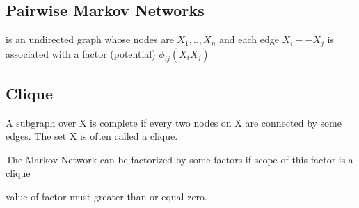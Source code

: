 \documentclass{book}
\begin{document}
\subsection{Pairwise Markov Networks}

is an undirected graph whose nodes are $X_1,..,X_n$ and each edge $X_i -- X_j$ is associated with a factor (potential) $\phi_{ij}(X_i X_j)$

\subsection{Clique}

A subgraph over X is complete if every two nodes on X are connected by some edges. The set X is often called a clique.

The Markov Network can be factorized by some factors if scope of this factor is a clique

value of factor must greater than or equal zero.
\end{document}
